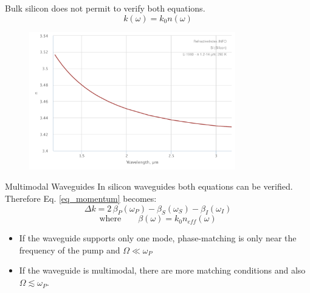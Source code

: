 \documentclass[11pt, leqno]{beamer}
\begin{document}
\begin{frame}
	Bulk silicon does not permit to verify both equations.
	\begin{equation}
	k(\omega) = k_0 n(\omega)
	\label{eq_k(w)}
	\end{equation}
	\begin{figure}
		\centering
		\includegraphics[width=0.8\textwidth]{RefractiveIndexINFO.pdf}
		\label{fig_silicon_dispersion}
	\end{figure}
\end{frame}
\begin{frame}{Multimodal Waveguides}
	In silicon waveguides both equations can be verified.\\
	Therefore Eq. \eqref{eq_momentum} becomes:
	\begin{equation}
		\Delta k = 2\,\beta_P(\omega_P) -\beta_S(\omega_S) -\beta_I(\omega_I)
		\label{eq_beta}
	\end{equation}
	\begin{equation*}
		\mathrm{where} \qquad	\beta(\omega) = k_0 n_{eff}(\omega)
	\end{equation*}
	\vspace{-5pt}
	\begin{itemize}
	\item	If the waveguide supports only one mode, phase-matching is only near the frequency of the pump and $\Omega \ll \omega_P$
	\item	If the waveguide is multimodal, there are more matching conditions and also $\Omega \lesssim \omega_P$.
	\end{itemize}
\end{frame}
\end{document}
